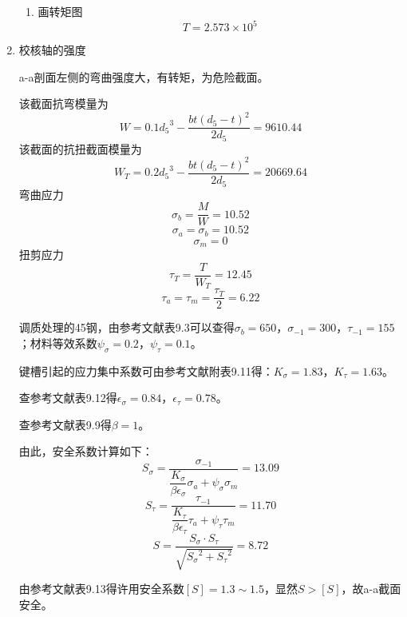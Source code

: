 \begin{enumerate}[A]
\begin{enumerate}[a]
		\item 画转矩图$$T=2.573\times 10^5$$
	\end{enumerate}
	\item 校核轴的强度
	\par a-a剖面左侧的弯曲强度大，有转矩，为危险截面。
	\par 该截面抗弯模量为
	$$W=0.1{d_5}^3-\dfrac{bt\left(d_5-t\right)^2}{2d_5}=9610.44$$
	该截面的抗扭截面模量为
	$$W_T=0.2{d_5}^3-\dfrac{bt\left(d_5-t\right)^2}{2d_5}=20669.64$$
	弯曲应力$$\sigma_b=\dfrac{M}{W}=10.52$$
	$$\sigma_a=\sigma_b=10.52$$
	$$\sigma_m=0$$
	扭剪应力
	$$\tau_T=\dfrac{T}{W_T}=12.45$$
	$$\tau_a=\tau_m=\dfrac{\tau_T}{2}=6.22$$
	\par 调质处理的45钢，由参考文献\cite{2}表9.3可以查得$\sigma_b=650$，$\sigma_{-1}=300$，$\tau_{-1}=155$；材料等效系数$\psi_\sigma=0.2$，$\psi_\tau=0.1$。
	\par 键槽引起的应力集中系数可由参考文献\cite{2}附表9.11得：$K_\sigma=1.83$，$K_\tau=1.63$。
	\par 查参考文献\cite{2}表9.12得$\epsilon_\sigma=0.84$，$\epsilon_\tau=0.78$。
	\par 查参考文献\cite{2}表9.9得$\beta=1$。
	\par 由此，安全系数计算如下：
	$$S_\sigma=\dfrac{\sigma_{-1}}{\dfrac{K_\sigma}{\beta \epsilon_\sigma}\sigma_a+\psi_\sigma \sigma_m}=13.09$$
	$$S_\tau=\dfrac{\tau_{-1}}{\dfrac{K_\tau}{\beta \epsilon_\tau}\tau_a+\psi_\tau \tau_m}=11.70$$
	$$S=\dfrac{S_\sigma\cdot S_\tau}{\sqrt{{S_\sigma}^2+{S_\tau}^2}}=8.72$$
	\par 由参考文献\cite{2}表9.13得许用安全系数$\left[S\right]=1.3\sim 1.5$，显然$S>\left[S\right]$，故a-a截面安全。
	

\end{enumerate}

